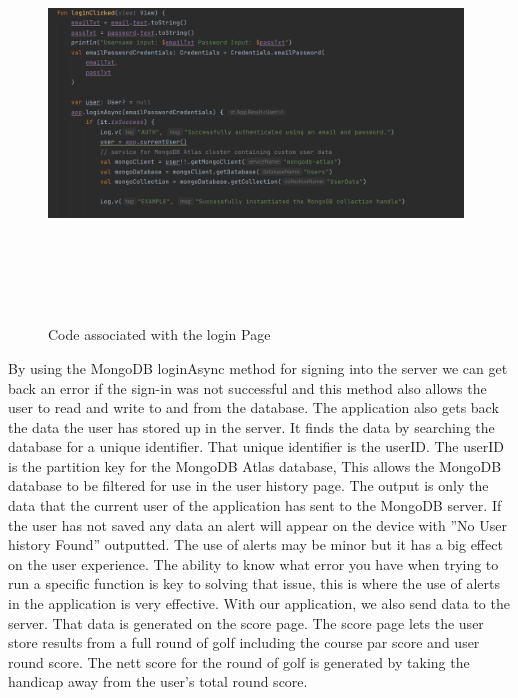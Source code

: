 \begin{figure}[H]
    \centering
    \includegraphics[width=11cm, height = 11cm]{img/mongoSignIn.PNG}
    \caption{Code associated with the login Page}
    \label{fig:altas config}
\end{figure}
By using the MongoDB loginAsync method for signing into the server we can get back an error if the sign-in was not successful and this method also allows the user to read and write to and from the database.
\newline
The application also gets back the data the user has stored up in the server. It finds the data by searching the database for a unique identifier. That unique identifier is the userID. The userID is the partition key for the MongoDB Atlas database, This allows the MongoDB database to be filtered for use in the user history page. The output is only the data that the current user of the application has sent to the MongoDB server. \newline
If the user has not saved any data an alert will appear on the device with ”No User history Found” outputted. The use of alerts may be minor but it has a big effect on the user experience. The ability to know what error you have when trying to run a specific function is key to solving that issue, this is where the use of alerts in the application is very effective.
\newpage
With our application, we also send data to the server. That data is generated on the score page. The score page lets the user store results from a full round of golf including the course par score and user round score. The nett score for the round of golf is generated by taking the handicap away from the user’s total round score.
